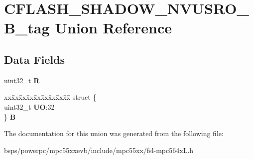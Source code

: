 \hypertarget{unionCFLASH__SHADOW__NVUSRO__32B__tag}{}\section{C\+F\+L\+A\+S\+H\+\_\+\+S\+H\+A\+D\+O\+W\+\_\+\+N\+V\+U\+S\+R\+O\+\_\+B\+\_\+tag Union Reference}
\label{unionCFLASH__SHADOW__NVUSRO__32B__tag}
\subsection*{Data Fields}
\begin{DoxyCompactItemize}
\item 
\mbox{\label{unionCFLASH__SHADOW__NVUSRO__32B__tag_aa5117754652899c19d2218981add8352}} 
uint32\+\_\+t {\bfseries R}
\item 
\mbox{\label{unionCFLASH__SHADOW__NVUSRO__32B__tag_a40aba568f967fc9f9e40092a444bd85b}} 
\begin{tabbing}
xx\=xx\=xx\=xx\=xx\=xx\=xx\=xx\=xx\=\kill
struct \{\\
\>uint32\_t {\bfseries UO}:32\\
\} {\bfseries B}\\

\end{tabbing}\end{DoxyCompactItemize}


The documentation for this union was generated from the following file\+:\begin{DoxyCompactItemize}
\item 
bsps/powerpc/mpc55xxevb/include/mpc55xx/fsl-\/mpc564x\+L.\+h\end{DoxyCompactItemize}
